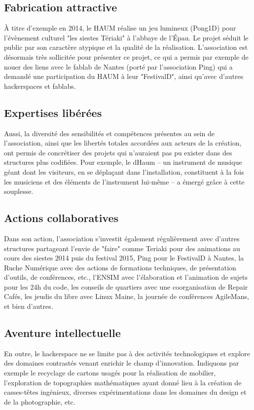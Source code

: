 \documentclass[a4paper,10pt]{scrartcl}
\begin{document}
\subsection*{Fabrication attractive}
À titre d'exemple en 2014, le HAUM réalise un jeu lumineux (Pong1D) pour l'évènement culturel "les siestes Tériaki" à l'abbaye de l'Épau. Le projet séduit le public par son caractère atypique et la qualité de la réalisation. L'association est désormais très sollicitée pour présenter ce projet, ce qui a permis par exemple de nouer des liens avec le fablab de Nantes (porté par l'association Ping) qui a demandé une participation du HAUM à leur "FestivalD", ainsi qu'avec d'autres hackerspaces et fablabs.

\subsection*{Expertises libérées}
Aussi, la diversité des sensibilités et compétences présentes au sein de l'association, ainsi que les libertés totales accordées aux acteurs de la création, ont permis de concrétiser des projets qui n'auraient pas pu exister dans des structures plus codifiées.
Pour exemple, le dHaum -- un instrument de musique géant dont les visiteurs, en se déplaçant dans l’installation, constituent à la fois les musiciens et des éléments de l'instrument lui-même -- a émergé grâce à cette souplesse.

\subsection*{Actions collaboratives}
Dans son action, l'association s'investit également régulièrement avec d'autres structures partageant l'envie de "faire" comme Teriaki pour des animations au cours des siestes 2014 puis du festival 2015, Ping pour le FestivalD à Nantes, la Ruche Numérique avec des actions de formations techniques, de présentation d'outils, de conférences, etc., l'ENSIM avec l'élaboration et l'animation de sujets pour les 24h du code, les conseils de quartiers avec une coorganisation de Repair Cafés, les jeudis du libre avec Linux Maine, la journée de conférences AgileMans, et bien d'autres.

\subsection*{Aventure intellectuelle}
En outre, le hackerspace ne se limite pas à des activités technologiques et explore des domaines contrastés venant enrichir le champ d'innovation. Indiquons par exemple le recyclage de cartons usagés pour la réalisation de mobilier, l'exploration de topographies mathématiques ayant donné lieu à la création de casses-têtes ingénieux, diverses expérimentations dans les domaines du design et de la photographie, etc.
\end{document}
